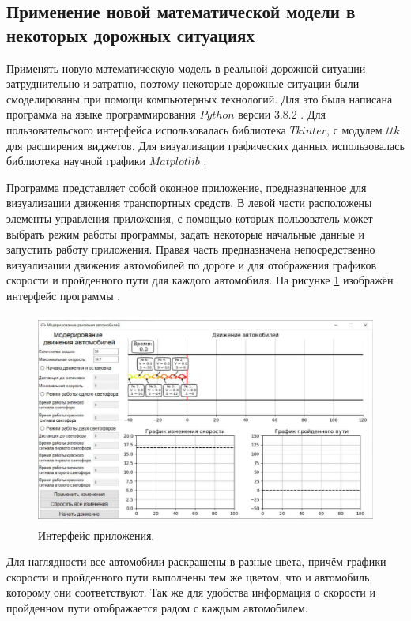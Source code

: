 \documentclass[12pt, a4paper]{extarticle}
\numberwithin{equation}{section}
\numberwithin{figure}{section}
\begin{document}
\subsection{Применение новой математической модели в некоторых дорожных ситуациях}

Применять новую математическую модель в реальной дорожной ситуации затруднительно и затратно, поэтому некоторые дорожные ситуации были смоделированы при помощи компьютерных технологий. Для это была написана программа на языке программирования $Python$ версии 3.8.2 \cite{Python}. Для пользовательского интерфейса использовалась библиотека $Tkinter$, с модулем $ttk$ для расширения виджетов. Для визуализации графических данных использовалась библиотека научной графики $Matplotlib$ \cite{Matplotlib}.

Программа представляет собой оконное приложение, предназначенное для визуализации движения транспортных средств. В левой части расположены элементы управления приложения, с помощью которых пользователь может выбрать режим работы программы, задать некоторые начальные данные и запустить работу приложения. Правая часть предназначена непосредственно визуализации движения автомобилей по дороге и для отображения графиков скорости и пройденного пути для каждого автомобиля. На рисунке \ref{window} изображён интерфейс программы . 

\begin{figure}[h!]  
	\begin{center}
		\includegraphics[keepaspectratio,width=160mm,height=70mm]
		{Images/screens/empty_window.pdf}
	\end{center}
	\caption{Интерфейс приложения.}
	\label{window}
\end{figure}

Для наглядности все автомобили раскрашены в разные цвета, причём графики скорости и пройденного пути выполнены тем же цветом, что и автомобиль, которому они соответствуют. Так же для удобства информация о скорости и пройденном пути отображается радом с каждым автомобилем.
\end{document}
